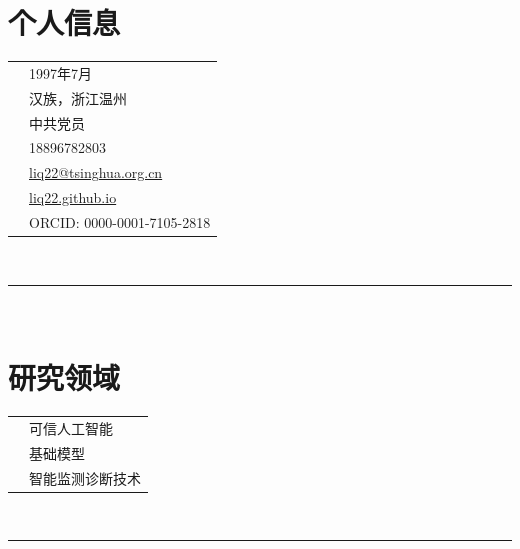 \documentclass[oneside]{article}
\begin{document}
{\begin{minipage}[t][\textheight-2\fboxsep-2\fboxrule][t]{\dimexpr0.40\textwidth-2\fboxrule-2\fboxsep\relax}
        \section*{\large 个人信息}
        \begin{tabularx}{\textwidth}{cY}
            \faBirthdayCake{} & 1997年7月 \\
            \faFlag{}       & 汉族，浙江温州 \\
            \faUserTie{}    & 中共党员 \\
            \faPhone{}      & 18896782803 \\
            \faEnvelope{}   & \href{mailto:liq22@tsinghua.org.cn}{liq22@tsinghua.org.cn} \\
            \faGlobe{}      & \href{https://liq22.github.io/}{liq22.github.io} \\
            \faIdCard{}     & ORCID: 0000-0001-7105-2818 \\
        \end{tabularx}
        \vspace{.3cm} \\
        \rule{\linewidth}{0.4pt} \\
        \section*{\large 研究领域}
        \begin{tabular}{cl}
            \faBrain{}      & 可信人工智能 \\
            \faCogs{}       & 基础模型 \\
            \faTools{}      & 智能监测诊断技术 \\
        \end{tabular}
        \vspace{10pt} \\
        \rule{\linewidth}{0.4pt} \\

\end{minipage}}
\end{document}
